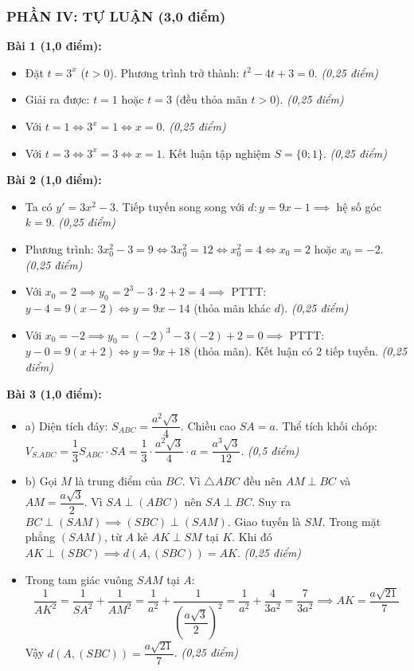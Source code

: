 \documentclass[12pt, a4paper]{article}
\begin{document}
\subsubsection*{PHẦN IV: TỰ LUẬN (3,0 điểm)}

\noindent \textbf{Bài 1 (1,0 điểm):}
\begin{itemize}
    \item Đặt $t = 3^x$ ($t > 0$). Phương trình trở thành: $t^2 - 4t + 3 = 0$. \hfill \textit{(0,25 điểm)}
    \item Giải ra được: $t = 1$ hoặc $t = 3$ (đều thỏa mãn $t > 0$). \hfill \textit{(0,25 điểm)}
    \item Với $t = 1 \iff 3^x = 1 \iff x = 0$. \hfill \textit{(0,25 điểm)}
    \item Với $t = 3 \iff 3^x = 3 \iff x = 1$. Kết luận tập nghiệm $S = \{0; 1\}$. \hfill \textit{(0,25 điểm)}
\end{itemize}

\noindent \textbf{Bài 2 (1,0 điểm):}
\begin{itemize}
    \item Ta có $y' = 3x^2 - 3$. Tiếp tuyến song song với $d: y = 9x - 1 \implies$ hệ số góc $k = 9$. \hfill \textit{(0,25 điểm)}
    \item Phương trình: $3x_0^2 - 3 = 9 \iff 3x_0^2 = 12 \iff x_0^2 = 4 \iff x_0 = 2$ hoặc $x_0 = -2$. \hfill \textit{(0,25 điểm)}
    \item Với $x_0 = 2 \implies y_0 = 2^3 - 3 \cdot 2 + 2 = 4 \implies$ PTTT: $y - 4 = 9(x - 2) \iff y = 9x - 14$ (thỏa mãn khác $d$). \hfill \textit{(0,25 điểm)}
    \item Với $x_0 = -2 \implies y_0 = (-2)^3 - 3(-2) + 2 = 0 \implies$ PTTT: $y - 0 = 9(x + 2) \iff y = 9x + 18$ (thỏa mãn). Kết luận có 2 tiếp tuyến. \hfill \textit{(0,25 điểm)}
\end{itemize}

\noindent \textbf{Bài 3 (1,0 điểm):}
\begin{itemize}
    \item a) Diện tích đáy: $S_{ABC} = \dfrac{a^2\sqrt{3}}{4}$. Chiều cao $SA = a$.
    Thể tích khối chóp: $V_{S.ABC} = \dfrac{1}{3} S_{ABC} \cdot SA = \dfrac{1}{3} \cdot \dfrac{a^2\sqrt{3}}{4} \cdot a = \dfrac{a^3\sqrt{3}}{12}$. \hfill \textit{(0,5 điểm)}
    \item b) Gọi $M$ là trung điểm của $BC$. Vì $\triangle ABC$ đều nên $AM \perp BC$ và $AM = \dfrac{a\sqrt{3}}{2}$.
    Vì $SA \perp (ABC)$ nên $SA \perp BC$. Suy ra $BC \perp (SAM) \implies (SBC) \perp (SAM)$.
    Giao tuyến là $SM$. Trong mặt phẳng $(SAM)$, từ $A$ kẻ $AK \perp SM$ tại $K$.
    Khi đó $AK \perp (SBC) \implies d(A, (SBC)) = AK$. \hfill \textit{(0,25 điểm)}
    \item Trong tam giác vuông $SAM$ tại $A$:
    $$\dfrac{1}{AK^2} = \dfrac{1}{SA^2} + \dfrac{1}{AM^2} = \dfrac{1}{a^2} + \dfrac{1}{\left(\dfrac{a\sqrt{3}}{2}\right)^2} = \dfrac{1}{a^2} + \dfrac{4}{3a^2} = \dfrac{7}{3a^2} \implies AK = \dfrac{a\sqrt{21}}{7}$$
    Vậy $d(A, (SBC)) = \dfrac{a\sqrt{21}}{7}$. \hfill \textit{(0,25 điểm)}
\end{itemize}
\end{document}
